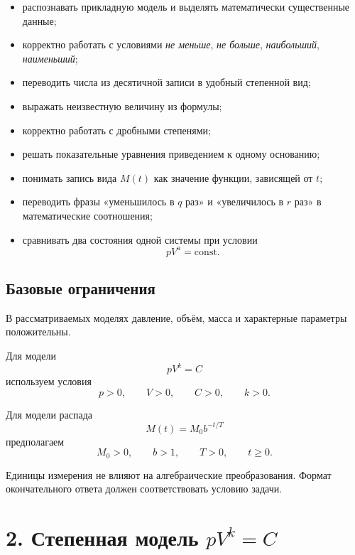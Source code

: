 \documentclass[a4paper,12pt]{article}
\newcommand{\sect}[1]{%
  \section*{\color{darkaccent}#1}%
}
\newcommand{\subsect}[1]{%
  \subsection*{\color{accent}#1}%
}
\begin{document}
\begin{itemize}

  \item распознавать прикладную модель и выделять математически существенные данные;

  \item корректно работать с условиями
  \textit{не меньше},
  \textit{не больше},
  \textit{наибольший},
  \textit{наименьший};

  \item переводить числа из десятичной записи в удобный степенной вид;

  \item выражать неизвестную величину из формулы;

  \item корректно работать с дробными степенями;

  \item решать показательные уравнения приведением к одному основанию;

  \item понимать запись вида $M(t)$ как значение функции, зависящей от $t$;

  \item переводить фразы
  «уменьшилось в $q$ раз»
  и
  «увеличилось в $r$ раз»
  в математические соотношения;

  \item сравнивать два состояния одной системы при условии
  \[
  pV^a=\mathrm{const}.
  \]

\end{itemize}


\subsect{Базовые ограничения}

В рассматриваемых моделях давление, объём, масса и характерные
параметры положительны.

Для модели
\[
pV^k=C
\]
используем условия
\[
p>0,
\qquad
V>0,
\qquad
C>0,
\qquad
k>0.
\]

Для модели распада
\[
M(t)=M_0b^{-t/T}
\]
предполагаем
\[
M_0>0,
\qquad
b>1,
\qquad
T>0,
\qquad
t\ge0.
\]

Единицы измерения не влияют на алгебраические преобразования.
Формат окончательного ответа должен соответствовать условию задачи.


\sect{2. Степенная модель \texorpdfstring{$pV^k=C$}{pV^k=C}}
\end{document}
